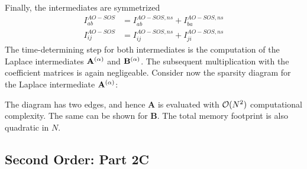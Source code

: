 \noindent Finally, the intermediates are symmetrized
\begin{align}
I^{AO-SOS}_{ab} &= I^{AO-SOS,ns}_{ab} + I^{AO-SOS,ns}_{ba} \\
I^{AO-SOS}_{ij} &= I^{AO-SOS,ns}_{ij} + I^{AO-SOS,ns}_{ji}
\end{align}
The time-determining step for both intermediates is the computation of the Laplace intermediates $\mathbf{A}^{(\alpha)}$ and $\mathbf{B}^{(\alpha)}$. The subsequent multiplication with the coefficient matrices is again negligeable. Consider now the sparsity diagram for the Laplace intermediate $\mathbf{A}^{(\alpha)}$:
\begin{center}
\end{center}

\noindent The diagram has two edges, and hence $\mathbf{A}$ is evaluated with $\mathcal{O}(N^{2})$ computational complexity. The same can be shown for $\mathbf{B}$. The total memory footprint is also quadratic in $N$. 

\subsection{Second Order: Part 2C}

